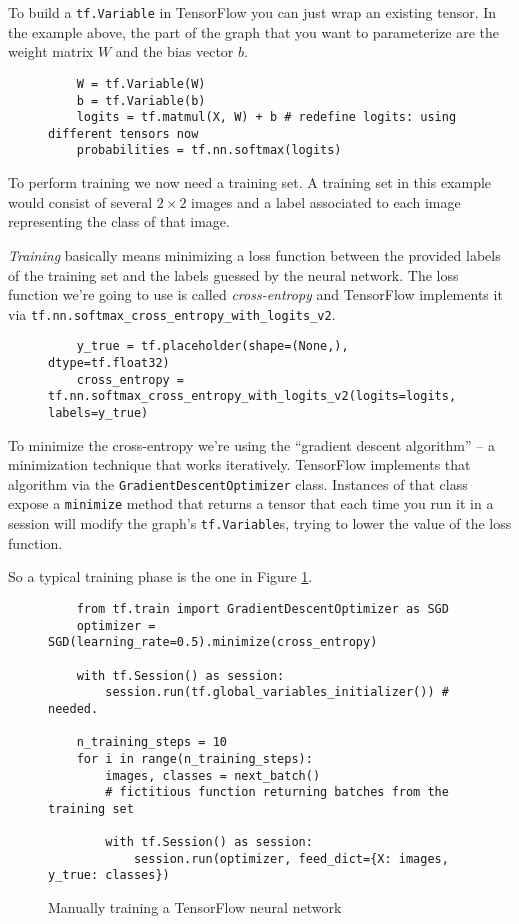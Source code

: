 To build a \texttt{tf.Variable} in TensorFlow you can just wrap an
existing tensor. In the example above, the part of the graph that you
want to parameterize are the weight matrix $W$ and the bias vector
$b$.

\begin{figure}
  \begin{verbatim}
    W = tf.Variable(W)
    b = tf.Variable(b)
    logits = tf.matmul(X, W) + b # redefine logits: using different tensors now
    probabilities = tf.nn.softmax(logits)
  \end{verbatim}
  \caption{}
\end{figure}

To perform training we now need a training set. A training set in this
example would consist of several \(2 \times 2\) images and a label
associated to each image representing the class of that image.

\emph{Training} basically means minimizing a loss function between the
provided labels of the training set and the labels guessed by the neural
network. The loss function we're going to use is called
\emph{cross-entropy} and TensorFlow implements it via
\texttt{tf.nn.softmax\_cross\_entropy\_with\_logits\_v2}.

\begin{figure}
  \begin{verbatim}
    y_true = tf.placeholder(shape=(None,), dtype=tf.float32)
    cross_entropy = tf.nn.softmax_cross_entropy_with_logits_v2(logits=logits, labels=y_true)
  \end{verbatim}
  \caption{}
\end{figure}

To minimize the cross-entropy we're using the ``gradient descent
algorithm'' -- a minimization technique that works iteratively.
TensorFlow implements that algorithm via the
\texttt{GradientDescentOptimizer} class. Instances of that class expose
a \texttt{minimize} method that returns a tensor that each time you
run it in a session will modify the graph's \texttt{tf.Variable}s,
trying to lower the value of the loss function.

So a typical training phase is the one in Figure \ref{fig:training}.

\begin{figure}
  \begin{verbatim}
    from tf.train import GradientDescentOptimizer as SGD
    optimizer = SGD(learning_rate=0.5).minimize(cross_entropy)

    with tf.Session() as session:
        session.run(tf.global_variables_initializer()) # needed.

    n_training_steps = 10
    for i in range(n_training_steps):
        images, classes = next_batch()
        # fictitious function returning batches from the training set

        with tf.Session() as session:
            session.run(optimizer, feed_dict={X: images, y_true: classes})
  \end{verbatim}
  \caption{Manually training a TensorFlow neural network}
  \label{fig:training}
\end{figure}

